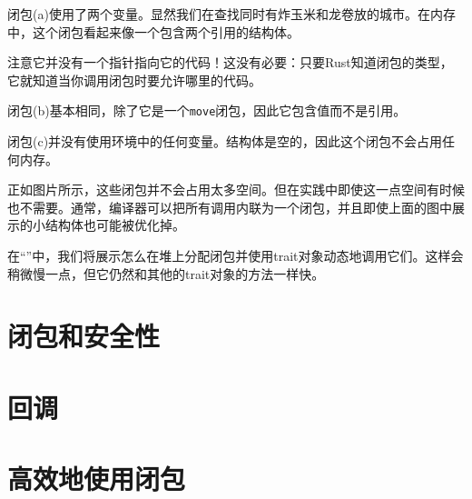 闭包(a)使用了两个变量。显然我们在查找同时有炸玉米和龙卷放的城市。在内存中，这个闭包看起来像一个包含两个引用的结构体。

注意它并没有一个指针指向它的代码！这没有必要：只要Rust知道闭包的类型，它就知道当你调用闭包时要允许哪里的代码。

闭包(b)基本相同，除了它是一个\texttt{move}闭包，因此它包含值而不是引用。

闭包(c)并没有使用环境中的任何变量。结构体是空的，因此这个闭包不会占用任何内存。

正如图片所示，这些闭包并不会占用太多空间。但在实践中即使这一点空间有时候也不需要。通常，编译器可以把所有调用内联为一个闭包，并且即使上面的图中展示的小结构体也可能被优化掉。

在“”中，我们将展示怎么在堆上分配闭包并使用trait对象动态地调用它们。这样会稍微慢一点，但它仍然和其他的trait对象的方法一样快。

\section{闭包和安全性}

\section{回调}\label{callback}

\section{高效地使用闭包}
